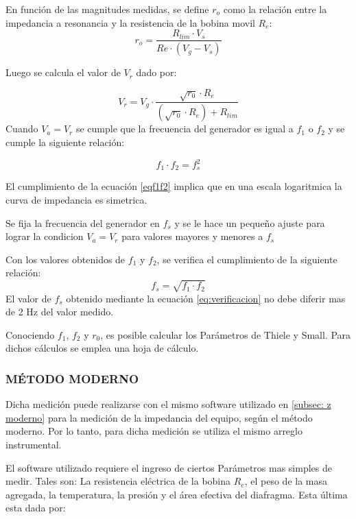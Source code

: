 \documentclass[]{article}
\begin{document}
\begin{multicols}{2}
En función de las magnitudes medidas, se define $r_o$ como la relación entre
la impedancia a resonancia y la resistencia de la bobina movil $R_e$:
\begin{equation}
  r_{o}=\frac{R_{lim} \cdot V_s}{Re \cdot (V_g-V_s)}
  \label{eq:ro}
\end{equation}

Luego se calcula el valor de $V_r$ dado por:

\begin{equation}
V_r = V_g \cdot \frac{\sqrt{r_0} \cdot R_e }{\left(\sqrt{r_0} \cdot R_e \right) + R_{lim}}
\end{equation}
Cuando $V_a=V_r$ se cumple que la frecuencia del generador es igual a $f_1$ o
 $f_2$  y se cumple la siguiente relación:

\begin{equation}
  f_1 \cdot f_2 = f_s^2
  \label{eqf1f2}
\end{equation}

El cumplimiento de la ecuación \ref{eqf1f2}
 implica que en una escala logaritmica
la curva de impedancia es simetrica.

Se fija la frecuencia del generador en $f_s$ y se le hace un pequeño ajuste
para lograr la condicion $V_a=V_r$ para valores mayores y menores a $f_s$

Con los valores obtenidos de $f_1$ y $f_2$, se verifica el cumplimiento de la
siguiente relación:
\begin{equation}
  f_s=\sqrt{f_1\cdot f_2}
  \label{eq:verificacion}
\end{equation}
El valor de $f_s$ obtenido mediante la ecuación \ref{eq:verificacion} no debe
diferir mas de 2 Hz del valor medido.

Conociendo $f_1$, $f_2$ y $r_0$, es posible calcular los Parámetros de Thiele y
Small. Para dichos cálculos se emplea una hoja de cálculo.

\subsubsection{MÉTODO MODERNO}
Dicha medición puede realizarse con el mismo software utilizado en \ref{subsec: z moderno}
para la medición de la impedancia del equipo, según el
método moderno. Por lo tanto, para dicha medición se utiliza el mismo
arreglo instrumental.

El software utilizado requiere el ingreso de ciertos Parámetros mas simples
de medir. Tales son: La resistencia eléctrica de la bobina $R_e$, el peso de
la masa agregada, la temperatura, la presión y el área efectiva del diafragma.
Esta última esta dada por:


\end{multicols}
\end{document}
